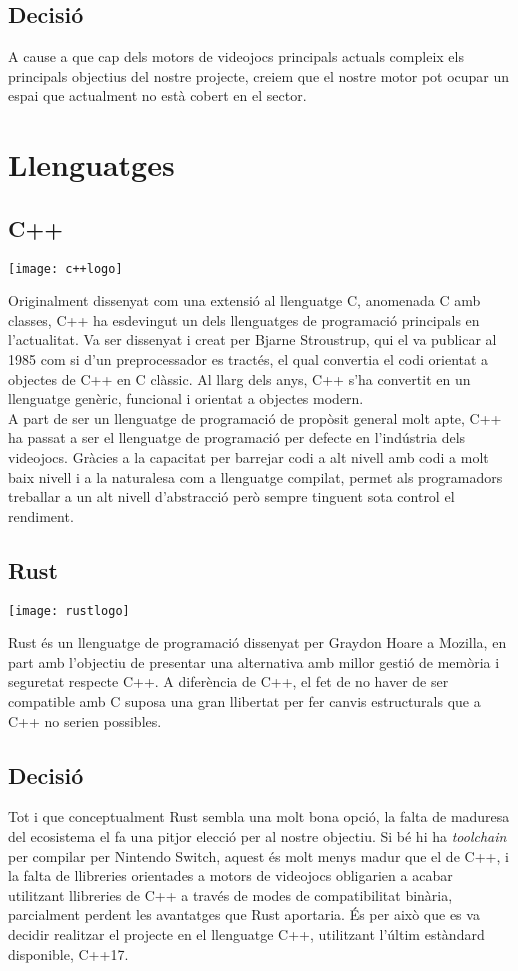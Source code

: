 \subsection{Decisió}
A cause a que cap dels motors de videojocs principals actuals compleix els principals objectius del nostre projecte, creiem que el nostre motor pot ocupar un espai que actualment no està cobert en el sector.
\section{Llenguatges}
\subsection{C++}
\begin{center}
  \texttt{[image: c++logo]}
\end{center}
Originalment dissenyat com una extensió al llenguatge C, anomenada C amb classes, C++ ha esdevingut un dels llenguatges de programació principals en l'actualitat. Va ser dissenyat i creat per Bjarne Stroustrup, qui el va publicar al 1985 com si d'un preprocessador es tractés, el qual convertia el codi orientat a objectes de C++ en C clàssic. Al llarg dels anys, C++ s'ha convertit en un llenguatge genèric, funcional i orientat a objectes modern.
\\
A part de ser un llenguatge de programació de propòsit general molt apte, C++ ha passat a ser el llenguatge de programació per defecte en l'indústria dels videojocs. Gràcies a la capacitat per barrejar codi a alt nivell amb codi a molt baix nivell i a la naturalesa com a llenguatge compilat, permet als programadors treballar a un alt nivell d'abstracció però sempre tinguent sota control el rendiment.


\subsection{Rust}
\begin{center}
  \texttt{[image: rustlogo]}
\end{center}
Rust és un llenguatge de programació dissenyat per Graydon Hoare a Mozilla, en part amb l'objectiu de presentar una alternativa amb millor gestió de memòria i seguretat respecte C++. A diferència de C++, el fet de no haver de ser compatible amb C suposa una gran llibertat per fer canvis estructurals que a C++ no serien possibles. 

\subsection{Decisió}
Tot i que conceptualment Rust sembla una molt bona opció, la falta de maduresa del ecosistema el fa una pitjor elecció per al nostre objectiu. Si bé hi ha \textit{toolchain} per compilar per Nintendo Switch, aquest és molt menys madur que el de C++, i la falta de llibreries orientades a motors de videojocs obligarien a acabar utilitzant llibreries de C++ a través de modes de compatibilitat binària, parcialment perdent les avantatges que Rust aportaria.
És per això que es va decidir realitzar el projecte en el llenguatge C++, utilitzant l'últim estàndard disponible, C++17.
